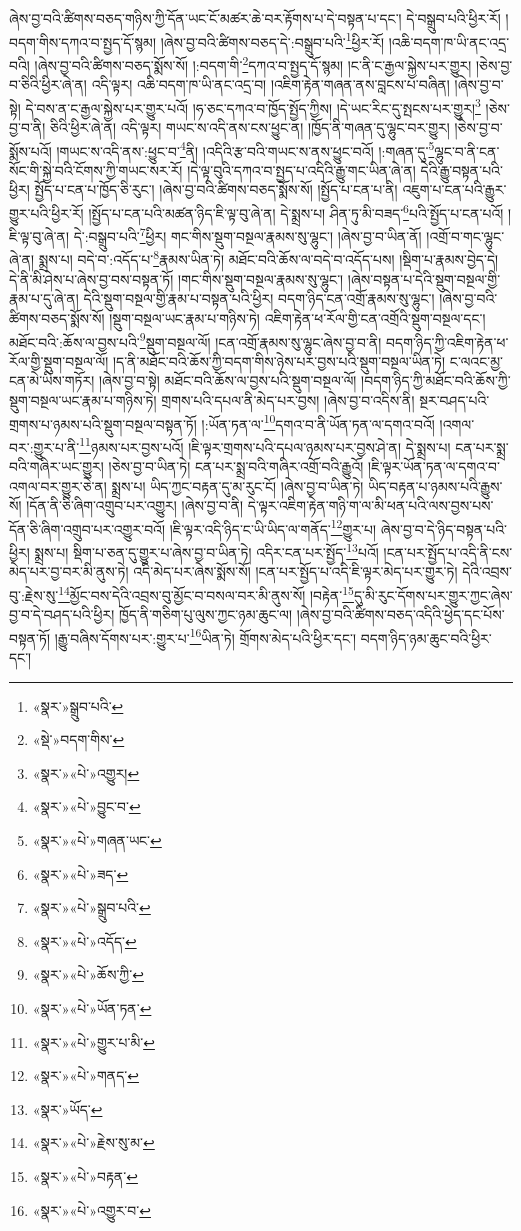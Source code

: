 ཞེས་བྱ་བའི་ཚིགས་བཅད་གཉིས་ཀྱི་དོན་ཡང་ངོ་མཚར་ཆེ་བར་རྟོགས་པ་དེ་བསྟན་པ་དང་། དེ་བསྒྲུབ་པའི་ཕྱིར་རོ། །བདག་གིས་དཀའ་བ་སྤྱད་དོ་སྙམ། །ཞེས་བྱ་བའི་ཚིགས་བཅད་དེ་:བསྒྲུབ་པའི་\footnote{«སྣར་»སྒྲུབ་པའི་}ཕྱིར་རོ། །འཆི་བདག་ཁ་ཡི་ནང་འདྲ་བའི། །ཞེས་བྱ་བའི་ཚིགས་བཅད་སྨོས་སོ། །:བདག་གི་\footnote{«སྡེ་»བདག་གིས་}དཀའ་བ་སྤྱད་དོ་སྙམ། །ང་ནི་ང་རྒྱལ་སྐྱེས་པར་གྱུར། །ཅེས་བྱ་བ་ཅིའི་ཕྱིར་ཞེ་ན། འདི་ལྟར། འཆི་བདག་ཁ་ཡི་ནང་འདྲ་བ། །འཇིག་རྟེན་གཞན་ནས་བླངས་པ་བཞིན། །ཞེས་བྱ་བ་སྟེ། དེ་བས་ན་ང་རྒྱལ་སྐྱེས་པར་གྱུར་པའོ། །ཧ་ཅང་དཀའ་བ་ཁྱོད་སྤྱོད་ཀྱིས། །དེ་ཡང་རིང་དུ་སྤངས་པར་གྱུར།\footnote{«སྣར་»«པེ་»འགྱུར།} །ཅེས་བྱ་བ་ནི། ཅིའི་ཕྱིར་ཞེ་ན། འདི་ལྟར། གཡང་ས་འདི་ནས་ངས་ཕྱུང་ན། །ཁྱོད་ནི་གཞན་དུ་ལྷུང་བར་གྱུར། །ཅེས་བྱ་བ་སྨོས་པའོ། །གཡང་ས་འདི་ནས་:ཕྱུང་བ་\footnote{«སྣར་»«པེ་»བྱུང་བ་}ནི། །འདིའི་རྩ་བའི་གཡང་ས་ནས་ཕྱུང་བའོ། །:གཞན་དུ་\footnote{«སྣར་»«པེ་»གཞན་ཡང་}ལྷུང་བ་ནི་ངན་སོང་གི་སྐྱེ་བའི་ངོགས་ཀྱི་གཡང་སར་རོ། །དེ་ལྟ་བུའི་དཀའ་བ་སྤྱད་པ་འདིའི་རྒྱུ་གང་ཡིན་ཞེ་ན། དེའི་རྒྱུ་བསྟན་པའི་ཕྱིར། སྤྱོད་པ་ངན་པ་ཁྱོད་ཅི་རུང་། །ཞེས་བྱ་བའི་ཚིགས་བཅད་སྨོས་སོ། །སྤྱོད་པ་ངན་པ་ནི། འཇུག་པ་ངན་པའི་རྒྱུར་གྱུར་པའི་ཕྱིར་རོ། །སྤྱོད་པ་ངན་པའི་མཚན་ཉིད་ཇི་ལྟ་བུ་ཞེ་ན། དེ་སྨྲས་པ། ཤིན་ཏུ་མི་བཟད་\footnote{«སྣར་»«པེ་»ཟད་}པའི་སྤྱོད་པ་ངན་པའོ། །ཇི་ལྟ་བུ་ཞེ་ན། དེ་:བསྒྲུབ་པའི་\footnote{«སྣར་»«པེ་»སྒྲུབ་པའི་}ཕྱིར། གང་གིས་སྡུག་བསྔལ་རྣམས་སུ་ལྷུང་། །ཞེས་བྱ་བ་ཡིན་ནོ། །འགྲོ་བ་གང་ལྷུང་ཞེ་ན། སྨྲས་པ། བདེ་བ་:འདོད་པ་\footnote{«སྣར་»«པེ་»འདོད་}རྣམས་ཡིན་ཏེ། མཐོང་བའི་ཆོས་ལ་བདེ་བ་འདོད་པས། །སྡིག་པ་རྣམས་བྱེད་དེ། དེ་ནི་མི་ཤེས་པ་ཞེས་བྱ་བས་བསྟན་ཏོ། །གང་གིས་སྡུག་བསྔལ་རྣམས་སུ་ལྷུང་། །ཞེས་བསྟན་པ་དེའི་སྡུག་བསྔལ་གྱི་རྣམ་པ་དུ་ཞེ་ན། དེའི་སྡུག་བསྔལ་གྱི་རྣམ་པ་བསྟན་པའི་ཕྱིར། བདག་ཉིད་ངན་འགྲོ་རྣམས་སུ་ལྷུང་། །ཞེས་བྱ་བའི་ཚིགས་བཅད་སྨོས་སོ། །སྡུག་བསྔལ་ཡང་རྣམ་པ་གཉིས་ཏེ། འཇིག་རྟེན་ཕ་རོལ་གྱི་ངན་འགྲོའི་སྡུག་བསྔལ་དང་། མཐོང་བའི་:ཆོས་ལ་བྱས་པའི་\footnote{«སྣར་»«པེ་»ཆོས་ཀྱི་}སྡུག་བསྔལ་ལོ། །ངན་འགྲོ་རྣམས་སུ་ལྷུང་ཞེས་བྱ་བ་ནི། བདག་ཉིད་ཀྱི་འཇིག་རྟེན་ཕ་རོལ་གྱི་སྡུག་བསྔལ་ལོ། །ད་ནི་མཐོང་བའི་ཆོས་ཀྱི་བདག་གིས་ཉེས་པར་བྱས་པའི་སྡུག་བསྔལ་ཡིན་ཏེ། ང་ལའང་མྱ་ངན་མེ་ཡིས་གཏོར། །ཞེས་བྱ་བ་སྟེ། མཐོང་བའི་ཆོས་ལ་བྱས་པའི་སྡུག་བསྔལ་ལོ། །བདག་ཉིད་ཀྱི་མཐོང་བའི་ཆོས་ཀྱི་སྡུག་བསྔལ་ཡང་རྣམ་པ་གཉིས་ཏེ། གྲགས་པའི་དཔལ་ནི་མེད་པར་བྱས། །ཞེས་བྱ་བ་འདིས་ནི། སྔར་བཤད་པའི་གྲགས་པ་ཉམས་པའི་སྡུག་བསྔལ་བསྟན་ཏོ། །:ཡོན་ཏན་ལ་\footnote{«སྣར་»«པེ་»ཡོན་ཏན་}དགའ་བ་ནི་ཡོན་ཏན་ལ་དགའ་བའོ། །འགལ་བར་:གྱུར་པ་ནི་\footnote{«སྣར་»«པེ་»གྱུར་པ་མི་}ཉམས་པར་བྱས་པའོ། །ཇི་ལྟར་གྲགས་པའི་དཔལ་ཉམས་པར་བྱས་ཤེ་ན། དེ་སྨྲས་པ། ངན་པར་སྨྲ་བའི་གཞིར་ཡང་གྱུར། །ཅེས་བྱ་བ་ཡིན་ཏེ། ངན་པར་སྨྲ་བའི་གཞིར་འགྲོ་བའི་རྒྱུའོ། །ཇི་ལྟར་ཡོན་ཏན་ལ་དགའ་བ་འགལ་བར་གྱུར་ཅེ་ན། སྨྲས་པ། ཡིད་ཀྱང་བརྟན་དུ་མ་རུང་ངོ། །ཞེས་བྱ་བ་ཡིན་ཏེ། ཡིད་བརྟན་པ་ཉམས་པའི་རྒྱུས་སོ། །དོན་ནི་ཅི་ཞིག་འགྲུབ་པར་འགྱུར། །ཞེས་བྱ་བ་ནི། དེ་ལྟར་འཇིག་རྟེན་གཉི་ག་ལ་མི་ཕན་པའི་ལས་བྱས་པས་དོན་ཅི་ཞིག་འགྲུབ་པར་འགྱུར་བའོ། །ཇི་ལྟར་འདི་ཉིད་ང་ཡི་ཡིད་ལ་གནོད་\footnote{«སྣར་»«པེ་»གནད་}གྱུར་པ། ཞེས་བྱ་བ་དེ་ཉིད་བསྟན་པའི་ཕྱིར། སྨྲས་པ། སྡིག་པ་ཅན་དུ་གྱུར་པ་ཞེས་བྱ་བ་ཡིན་ཏེ། འདིར་ངན་པར་སྤྱོད་\footnote{«སྣར་»ཡོད་}པའོ། །ངན་པར་སྤྱོད་པ་འདི་ནི་ངས་མེད་པར་བྱ་བར་མི་ནུས་ཏེ། འདི་མེད་པར་ཞེས་སྨོས་སོ། །ངན་པར་སྤྱོད་པ་འདི་ཇི་ལྟར་མེད་པར་གྱུར་ཏེ། དེའི་འབྲས་བུ་:རྗེས་སུ་\footnote{«སྣར་»«པེ་»རྗེས་སུ་མ་}མྱོང་བས་དེའི་འབྲས་བུ་མྱོང་བ་བསལ་བར་མི་ནུས་སོ། །བརྟེན་\footnote{«སྣར་»«པེ་»བརྟན་}དུ་མི་རུང་དོགས་པར་གྱུར་ཀྱང་ཞེས་བྱ་བ་དེ་བཤད་པའི་ཕྱིར། ཁྱོད་ནི་གཅིག་པུ་ལུས་ཀྱང་ཉམ་ཆུང་ལ། །ཞེས་བྱ་བའི་ཚིགས་བཅད་འདིའི་ཕྱེད་དང་པོས་བསྟན་ཏོ། །རྒྱུ་བཞིས་དོགས་པར་:གྱུར་པ་\footnote{«སྣར་»«པེ་»འགྱུར་བ་}ཡིན་ཏེ། གྲོགས་མེད་པའི་ཕྱིར་དང་། བདག་ཉིད་ཉམ་ཆུང་བའི་ཕྱིར་དང་། 